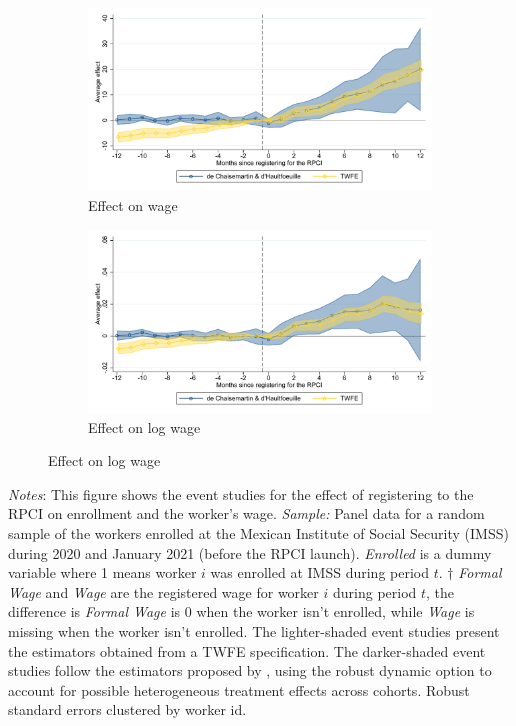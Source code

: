 \documentclass[10pt, oneside]{book}
\begin{document}
\begin{figure}[H]
    \begin{subfigure}{0.49\textwidth}
    \caption{Effect on wage}
    \includegraphics[width=\textwidth]{04_Figures/muestra_10porciento/event_study_sal_cierre_connected.pdf}
    \end{subfigure}
    \begin{subfigure}{0.49\textwidth}
    \caption{Effect on log wage}
    \includegraphics[width=\textwidth]{04_Figures/muestra_10porciento/event_study_log_sal_cierre_connected.pdf}
    \end{subfigure}
    
\end{figure}

\scriptsize{
\noindent \textit{Notes}: This figure shows the event studies for the effect of registering to the RPCI on enrollment and the worker's wage. \textit{Sample:} Panel data for a random sample of the workers enrolled at the Mexican Institute of Social Security (IMSS) during 2020 and January 2021 (before the RPCI launch). \textit{Enrolled} is a dummy variable where 1 means worker $i$ was enrolled at IMSS during period $t$. $\dagger$ \textit{Formal Wage} and \textit{Wage} are the registered wage for worker $i$ during period $t$, the difference is \textit{Formal Wage} is 0 when the worker isn't enrolled, while \textit{Wage} is missing when the worker isn't enrolled. The lighter-shaded event studies present the estimators obtained from a TWFE specification. The darker-shaded event studies follow the estimators proposed by \cite{de2020two}, using the robust dynamic option to account for possible heterogeneous treatment effects across cohorts. Robust standard errors clustered by worker id. %
} \\
\end{document}
